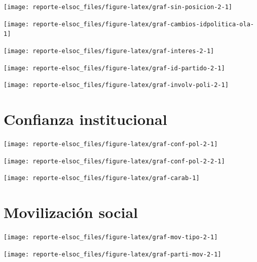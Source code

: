 \documentclass[
  12pt,
]{book}
\begin{document}
\begin{center}\texttt{[image: reporte-elsoc\_files/figure-latex/graf-sin-posicion-2-1]} \end{center}

\begin{center}\texttt{[image: reporte-elsoc\_files/figure-latex/graf-cambios-idpolitica-ola-1]} \end{center}

\begin{center}\texttt{[image: reporte-elsoc\_files/figure-latex/graf-interes-2-1]} \end{center}

\begin{center}\texttt{[image: reporte-elsoc\_files/figure-latex/graf-id-partido-2-1]} \end{center}

\begin{center}\texttt{[image: reporte-elsoc\_files/figure-latex/graf-involv-poli-2-1]} \end{center}

\hypertarget{confianza-institucional}{%
\section{Confianza institucional}\label{confianza-institucional}}

\begin{center}\texttt{[image: reporte-elsoc\_files/figure-latex/graf-conf-pol-2-1]} \end{center}

\begin{center}\texttt{[image: reporte-elsoc\_files/figure-latex/graf-conf-pol-2-2-1]} \end{center}

\begin{center}\texttt{[image: reporte-elsoc\_files/figure-latex/graf-carab-1]} \end{center}

\hypertarget{movilizaciuxf3n-social}{%
\section{Movilización social}\label{movilizaciuxf3n-social}}

\begin{center}\texttt{[image: reporte-elsoc\_files/figure-latex/graf-mov-tipo-2-1]} \end{center}

\begin{center}\texttt{[image: reporte-elsoc\_files/figure-latex/graf-parti-mov-2-1]} \end{center}
\end{document}
